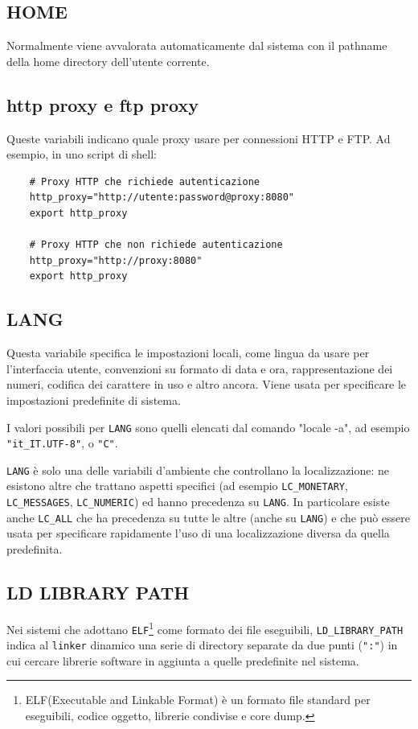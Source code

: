\subsection{HOME}
Normalmente viene avvalorata automaticamente dal sistema con il pathname della home directory dell'utente corrente. 

\subsection{http proxy e ftp proxy}
 Queste variabili indicano quale proxy usare per connessioni HTTP e FTP. Ad esempio, in uno script di shell: 
 \begin{verbatim}
 	# Proxy HTTP che richiede autenticazione
 	http_proxy="http://utente:password@proxy:8080"
 	export http_proxy
 	
 	# Proxy HTTP che non richiede autenticazione
 	http_proxy="http://proxy:8080"
 	export http_proxy
 \end{verbatim}

\subsection{LANG}
Questa variabile specifica le impostazioni locali, come lingua da usare per l'interfaccia utente, convenzioni su formato di data e ora, rappresentazione dei numeri, codifica dei carattere in uso e altro ancora. Viene usata per specificare le impostazioni predefinite di sistema.

I valori possibili per \verb*|LANG| sono quelli elencati dal comando "locale -a", ad esempio \verb*|"it_IT.UTF-8"|, o \verb*|"C"|.

\verb*|LANG| è solo una delle variabili d'ambiente che controllano la localizzazione: ne esistono altre che trattano aspetti specifici (ad esempio \verb*|LC_MONETARY|, \verb*|LC_MESSAGES|, \verb*|LC_NUMERIC|) ed hanno precedenza su \verb*|LANG|. In particolare esiste anche \verb*|LC_ALL| che ha precedenza su tutte le altre (anche su \verb*|LANG|) e che può essere usata per specificare rapidamente l'uso di una localizzazione diversa da quella predefinita. 

\subsection{LD LIBRARY PATH}
Nei sistemi che adottano \verb*|ELF|\footnote{ELF(Executable and Linkable Format) è un formato file standard per eseguibili, codice oggetto, librerie condivise e core dump.} come formato dei file eseguibili, \verb*|LD_LIBRARY_PATH| indica al \verb*|linker| dinamico una serie di directory separate da due punti (\verb*|":"|) in cui cercare librerie software in aggiunta a quelle predefinite nel sistema. 

